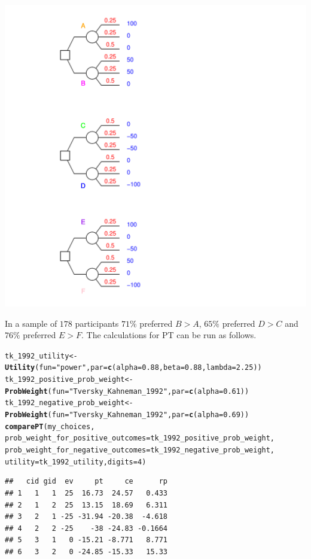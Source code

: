 \documentclass{article}\usepackage[]{graphicx}\usepackage[]{color}
\makeatletter
\newcommand{\hlnum}[1]{\textcolor[rgb]{0.686,0.059,0.569}{#1}}%
\newcommand{\hlstr}[1]{\textcolor[rgb]{0.192,0.494,0.8}{#1}}%
\newcommand{\hlstd}[1]{\textcolor[rgb]{0.345,0.345,0.345}{#1}}%
\newcommand{\hlkwb}[1]{\textcolor[rgb]{0.69,0.353,0.396}{#1}}%
\newcommand{\hlkwc}[1]{\textcolor[rgb]{0.333,0.667,0.333}{#1}}%
\newcommand{\hlkwd}[1]{\textcolor[rgb]{0.737,0.353,0.396}{\textbf{#1}}}%
\newenvironment{kframe}{%
 \def\at@end@of@kframe{}%
 \ifinner\ifhmode%
  \def\at@end@of@kframe{\end{minipage}}%
  \begin{minipage}{\columnwidth}%
 \fi\fi%
 \def\FrameCommand##1{\hskip\@totalleftmargin \hskip-\fboxsep
 \colorbox{shadecolor}{##1}\hskip-\fboxsep
     \hskip-\linewidth \hskip-\@totalleftmargin \hskip\columnwidth}%
 \MakeFramed {\advance\hsize-\width
   \@totalleftmargin\z@ \linewidth\hsize
   \@setminipage}}%
 {\par\unskip\endMakeFramed%
 \at@end@of@kframe}
\newenvironment{knitrout}{}{} %
\makeatother
\begin{document}
\begin{knitrout}
{\centering \includegraphics[width=0.8\linewidth]{figure/unnamed-chunk-40} 

}



\end{knitrout}


In a sample of $178$ participants $71\%$ preferred $B > A$, $65\%$ preferred $D > C$ and $76\%$ preferred $E > F$. The calculations for PT can be run as follows.

\begin{knitrout}
\color{fgcolor}\begin{kframe}
\begin{alltt}
\hlstd{tk_1992_utility} \hlkwb{<-} \hlkwd{Utility}\hlstd{(}\hlkwc{fun}\hlstd{=}\hlstr{"power"}\hlstd{,} \hlkwc{par}\hlstd{=}\hlkwd{c}\hlstd{(}\hlkwc{alpha}\hlstd{=}\hlnum{0.88}\hlstd{,} \hlkwc{beta}\hlstd{=}\hlnum{0.88}\hlstd{,} \hlkwc{lambda}\hlstd{=}\hlnum{2.25}\hlstd{))}
\hlstd{tk_1992_positive_prob_weight} \hlkwb{<-} \hlkwd{ProbWeight}\hlstd{(}\hlkwc{fun}\hlstd{=}\hlstr{"Tversky_Kahneman_1992"}\hlstd{,} \hlkwc{par}\hlstd{=}\hlkwd{c}\hlstd{(}\hlkwc{alpha}\hlstd{=}\hlnum{0.61}\hlstd{))}
\hlstd{tk_1992_negative_prob_weight} \hlkwb{<-} \hlkwd{ProbWeight}\hlstd{(}\hlkwc{fun}\hlstd{=}\hlstr{"Tversky_Kahneman_1992"}\hlstd{,} \hlkwc{par}\hlstd{=}\hlkwd{c}\hlstd{(}\hlkwc{alpha}\hlstd{=}\hlnum{0.69}\hlstd{))}
\hlkwd{comparePT}\hlstd{(my_choices,}
        \hlkwc{prob_weight_for_positive_outcomes}\hlstd{=tk_1992_positive_prob_weight,}
        \hlkwc{prob_weight_for_negative_outcomes}\hlstd{=tk_1992_negative_prob_weight,}
        \hlkwc{utility}\hlstd{=tk_1992_utility,} \hlkwc{digits}\hlstd{=}\hlnum{4}\hlstd{)}
\end{alltt}
\begin{verbatim}
##   cid gid  ev     pt     ce      rp
## 1   1   1  25  16.73  24.57   0.433
## 2   1   2  25  13.15  18.69   6.311
## 3   2   1 -25 -31.94 -20.38  -4.618
## 4   2   2 -25    -38 -24.83 -0.1664
## 5   3   1   0 -15.21 -8.771   8.771
## 6   3   2   0 -24.85 -15.33   15.33
\end{verbatim}
\end{kframe}
\end{knitrout}
\end{document}
